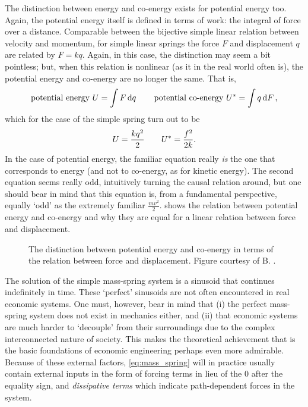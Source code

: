 The distinction between energy and co-energy exists for potential energy too. Again, the potential energy itself is defined in terms of work: the integral of force over a distance. Comparable between the bijective simple linear relation between velocity and momentum, for simple linear springs the force $F$ and displacement $q$ are related by $F = kq$. Again, in this case, the distinction may seem a bit pointless; but, when this relation is nonlinear (as it in the real world often is), the potential energy and co-energy are no longer the same. That is,
$$ \text{potential energy } U = \int F \dd{q} \qquad \text{potential co-energy } U^* = \int q \dd{F}, $$
which for the case of the simple spring turn out to be
$$ U = \frac{kq^2}{2} \qquad U^* = \frac{f^2}{2k}. $$
In the case of potential energy, the familiar equation really \emph{is} the one that corresponds to energy (and not to co-energy, as for kinetic energy). The second equation seems really odd, intuitively turning the causal relation around, but one should bear in mind that this equation is, from a fundamental perspective, equally `odd' as the extremely familiar $\frac{mv^2}{2}$.  shows the relation between potential energy and co-energy and why they are equal for a linear relation between force and displacement.
\begin{figure}[ht]
    \centering
    
    \caption{The distinction between potential energy and co-energy in terms of the relation between force and displacement. Figure courtesy of B. \citet{Krabbenborg2021}.}
    \label{fig:potential_energy}
\end{figure}

The solution of the simple mass-spring system is a sinusoid that continues indefinitely in time. These `perfect' sinusoids are not often encountered in real economic systems. One must, however, bear in mind that (i) the perfect mass-spring system does not exist in mechanics either, and (ii) that economic systems are much harder to `decouple' from their surroundings due to the complex interconnected nature of society. This makes the theoretical achievement that is the basic foundations of economic engineering perhaps even more admirable. Because of these external factors, \cref{eq:mass_spring} will in practice usually contain external inputs in the form of forcing terms in lieu of the 0 after the equality sign, and \emph{dissipative terms} which indicate path-dependent forces in the system. 

\clearpage
